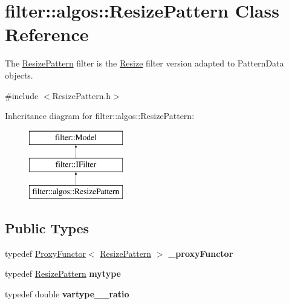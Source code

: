 \hypertarget{classfilter_1_1algos_1_1_resize_pattern}{}\section{filter\+:\+:algos\+:\+:Resize\+Pattern Class Reference}
\label{classfilter_1_1algos_1_1_resize_pattern}


The \hyperlink{classfilter_1_1algos_1_1_resize_pattern}{Resize\+Pattern} filter is the \hyperlink{classfilter_1_1algos_1_1_resize}{Resize} filter version adapted to Pattern\+Data objects.  




{\ttfamily \#include $<$Resize\+Pattern.\+h$>$}

Inheritance diagram for filter\+:\+:algos\+:\+:Resize\+Pattern\+:\begin{figure}[H]
\begin{center}
\leavevmode
\includegraphics[height=3.000000cm]{dd/d7a/classfilter_1_1algos_1_1_resize_pattern}
\end{center}
\end{figure}
\subsection*{Public Types}
\begin{DoxyCompactItemize}
\item 
\mbox{\label{classfilter_1_1algos_1_1_resize_pattern_a3e82cb3ba255aad9bd48a7c61cca7685}} 
typedef \hyperlink{class_proxy_functor}{Proxy\+Functor}$<$ \hyperlink{classfilter_1_1algos_1_1_resize_pattern}{Resize\+Pattern} $>$ {\bfseries \+\_\+proxy\+Functor}
\item 
\mbox{\label{classfilter_1_1algos_1_1_resize_pattern_aa9cc55ed98cd4cefe1e009ef21a4e3d9}} 
typedef \hyperlink{classfilter_1_1algos_1_1_resize_pattern}{Resize\+Pattern} {\bfseries mytype}
\item 
\mbox{\label{classfilter_1_1algos_1_1_resize_pattern_ad4535fdce81bbd45049ed04f31d093c6}} 
typedef double {\bfseries vartype\+\_\+\+\_\+ratio}
\end{DoxyCompactItemize}
